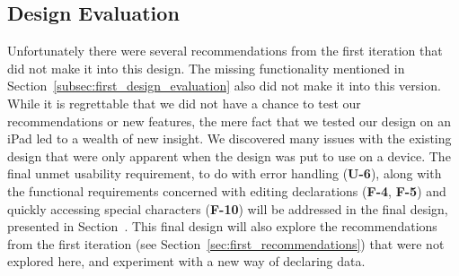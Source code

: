 \subsection{Design Evaluation}
\label{second_design_evaluation}
Unfortunately there were several recommendations from the first iteration that did not make it into this design. 
The missing functionality mentioned in Section~\ref{subsec:first_design_evaluation} also did not make it into this version.
While it is regrettable that we did not have a chance to test our recommendations or new features, the mere fact that we tested our design on an iPad led to a wealth of new insight.
We discovered many issues with the existing design that were only apparent when the design was put to use on a device. 
The final unmet usability requirement, to do with error handling (\textbf{U-6}), along with the functional requirements concerned with editing declarations (\textbf{F-4}, \textbf{F-5}) and quickly accessing special characters (\textbf{F-10}) will be addressed in the final design, presented in Section~. 
This final design will also explore the recommendations from the first iteration (see Section~\ref{sec:first_recommendations}) that were not explored here, and experiment with a new way of declaring data.














